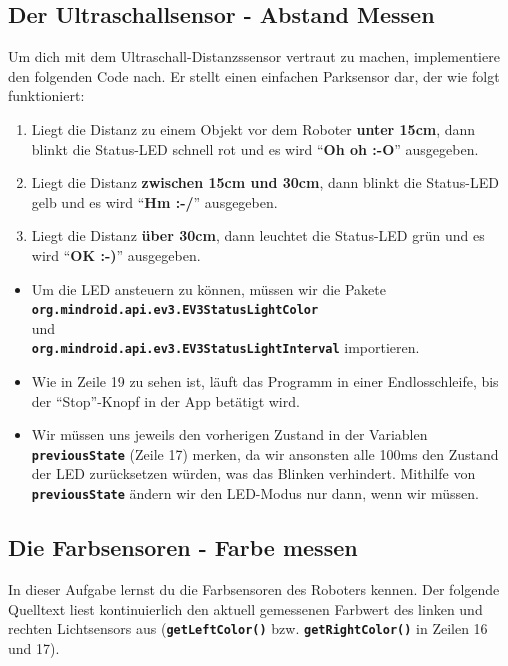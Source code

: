\documentclass[
	12pt,
	colorbacktitle,
	accentcolor=tud1c,
	draft,
	twoside,
	german
]{tudexercise}
\newcommand{\solpath}[0]{../../impl/androidApp/app/src/main/java/org/mindroid/android/app/programs/workshop/solutions}
\newcommand{\bfcode}[1]{\texttt{\textbf{#1}}}
\begin{document}
	\subsection{Der Ultraschallsensor - Abstand Messen}
	Um dich mit dem Ultraschall-Distanzssensor vertraut zu machen, implementiere den folgenden Code nach. Er stellt einen einfachen Parksensor dar, der wie folgt funktioniert:
	\begin{enumerate}
	\item Liegt die Distanz zu einem Objekt vor dem Roboter \textbf{unter 15cm}, dann blinkt die Status-LED schnell rot und es wird “\textbf{Oh oh :-O}” ausgegeben.
	\item Liegt die Distanz \textbf{zwischen 15cm und 30cm}, dann blinkt die Status-LED gelb und es wird “\textbf{Hm :-/}” ausgegeben.
	\item Liegt die Distanz \textbf{über 30cm}, dann leuchtet die Status-LED grün und es wird “\textbf{OK :-)}” ausgegeben.
	\end{enumerate}
	
	
	
	\begin{itemize}
	\item Um die LED ansteuern zu können, müssen wir die Pakete \\ \bfcode{org.mindroid.api.ev3.EV3StatusLightColor}\\ und\\ \bfcode{org.mindroid.api.ev3.EV3StatusLightInterval} importieren.
	\item Wie in Zeile 19 zu sehen ist, läuft das Programm in einer Endlosschleife, bis der “Stop”-Knopf in der App betätigt wird.
	\item Wir müssen uns jeweils den vorherigen Zustand in der Variablen \bfcode{previousState} (Zeile 17) merken, da wir ansonsten alle 100ms den Zustand der LED zurücksetzen würden, was das Blinken verhindert. Mithilfe von \bfcode{previousState} ändern wir den LED-Modus nur dann, wenn wir müssen.
	
	\end{itemize}
	
	\subsection{Die Farbsensoren - Farbe messen}
	In dieser Aufgabe lernst du die Farbsensoren des Roboters kennen. Der folgende Quelltext liest kontinuierlich den aktuell gemessenen Farbwert des linken und rechten Lichtsensors aus (\bfcode{getLeftColor()} bzw. \bfcode{getRightColor()} in Zeilen 16 und 17).
	\\
	
\end{document}
